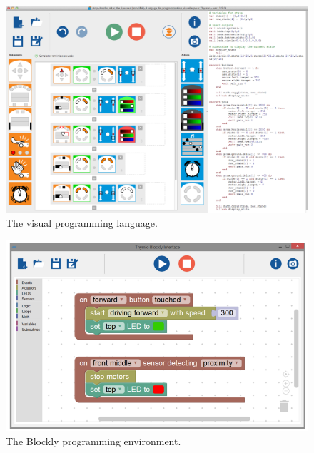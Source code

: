 \documentclass[letterpaper, 10 pt, conference]{ieeeconf}  %
\begin{document}
\begin{figure}
\centering
\includegraphics[width=\columnwidth]{figures/vpl}
\caption{The visual programming language.}
\label{fig:vpl}
\end{figure}

\begin{figure}
\centering
\includegraphics[width=\columnwidth]{figures/blockly}
\caption{The Blockly programming environment.}
\label{fig:blockly}
\end{figure}
\end{document}
